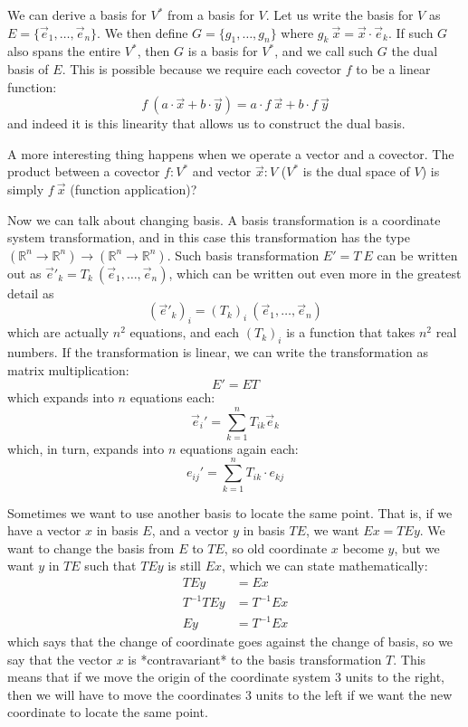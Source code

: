 We can derive a basis for $V^*$ from a basis for $V$.
Let us write the basis for $V$ as $E = \{ \vec{e}_1, \ldots, \vec{e}_n \}$.
We then define $G = \{ g_1, \ldots, g_n \}$ where $g_k~\vec{x} = \vec{x}\cdot\vec{e}_k$.
If such $G$ also spans the entire $V^*$,
then $G$ is a basis for $V^*$,
and we call such $G$ the dual basis of $E$.
This is possible because we require each covector $f$ to be a linear function:
\[
f~(a\cdot\vec{x}+b\cdot\vec{y}) = a \cdot f~\vec{x} + b \cdot f~\vec{y}
\]
and indeed it is this linearity that allows us to construct the dual basis.

A more interesting thing happens when we operate a vector and a covector.
The product between a covector $f : V^*$ and vector $\vec{x} : V$
($V^*$ is the dual space of $V$)
is simply $f~\vec{x}$ (function application)?

Now we can talk about changing basis.
A basis transformation is a coordinate system transformation,
and in this case this transformation has the type
$(\mathbb{R}^n \to \mathbb{R}^n) \to (\mathbb{R}^n \to \mathbb{R}^n)$.
Such basis transformation $E' = T~E$ can be written out
as $\vec{e}'_k = T_k~(\vec{e}_1, \ldots, \vec{e}_n)$,
which can be written out even more in the greatest detail as
\[
(\vec{e}'_k)_i = (T_k)_i~(\vec{e}_1, \ldots, \vec{e}_n)
\]
which are actually $n^2$ equations,
and each $(T_k)_i$ is a function that takes $n^2$ real numbers.
If the transformation is linear,
we can write the transformation as matrix multiplication:
\[
E' = ET
\]
which expands into $n$ equations each:
\[
\vec{e}_i' = \sum_{k=1}^n T_{ik} \vec{e}_k
\]
which, in turn, expands into $n$ equations again each:
\[
e_{ij}' = \sum_{k=1}^n T_{ik} \cdot e_{kj}
\]

Sometimes we want to use another basis to locate the same point.
That is, if we have a vector $x$ in basis $E$, and a vector $y$ in basis $TE$,
we want $Ex = TEy$.
We want to change the basis from $E$ to $TE$,
so old coordinate $x$ become $y$,
but we want $y$ in $TE$ such that $TEy$ is still $Ex$,
which we can state mathematically:
\begin{align*}
TEy &= Ex
\\ T^{-1}TEy &= T^{-1}Ex
\\ Ey &= T^{-1}Ex
\end{align*}
which says that the change of coordinate goes against the change of basis,
so we say that the vector $x$ is *contravariant* to the basis transformation $T$.
This means that if we move the origin of the coordinate system 3 units to the right,
then we will have to move the coordinates 3 units to the left
if we want the new coordinate to locate the same point.

